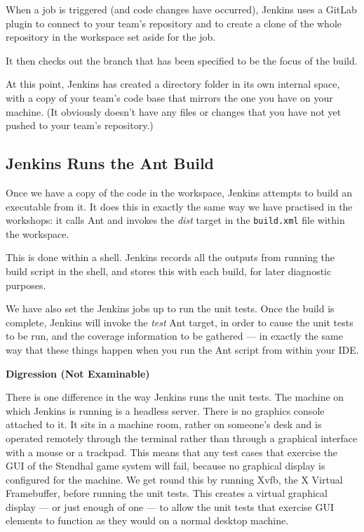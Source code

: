 \documentclass[
]{book}
\begin{document}
When a job is triggered (and code changes have occurred), Jenkins uses a GitLab plugin to connect to your team's repository and to create a clone of the whole repository in the workspace set aside for the job.

It then checks out the branch that has been specified to be the focus of the build.

At this point, Jenkins has created a directory folder in its own internal space, with a copy of your team's code base that mirrors the one you have on your machine. (It obviously doesn't have any files or changes that you have not yet pushed to your team's repository.)

\hypertarget{antbuild}{%
\subsection{Jenkins Runs the Ant Build}\label{antbuild}}

Once we have a copy of the code in the workspace, Jenkins attempts to build an executable from it. It does this in exactly the same way we have practised in the workshops: it calls Ant and invokes the \emph{dist} target in the \texttt{build.xml} file within the workspace.

This is done within a shell. Jenkins records all the outputs from running the build script in the shell, and stores this with each build, for later diagnostic purposes.

We have also set the Jenkins jobs up to run the unit tests. Once the build is complete, Jenkins will invoke the \emph{test} Ant target, in order to cause the unit tests to be run, and the coverage information to be gathered --- in exactly the same way that these things happen when you run the Ant script from within your IDE.

\textbf{Digression (Not Examinable)}

There is one difference in the way Jenkins runs the unit tests. The machine on which Jenkins is running is a headless server. There is no graphics console attached to it. It sits in a machine room, rather on someone's desk and is operated remotely through the terminal rather than through a graphical interface with a mouse or a trackpad. This means that any test cases that exercise the GUI of the Stendhal game system will fail, because no graphical display is configured for the machine. We get round this by running Xvfb, the X Virtual Framebuffer, before running the unit tests. This creates a virtual graphical display --- or just enough of one --- to allow the unit tests that exercise GUI elements to function as they would on a normal desktop machine.
\end{document}
